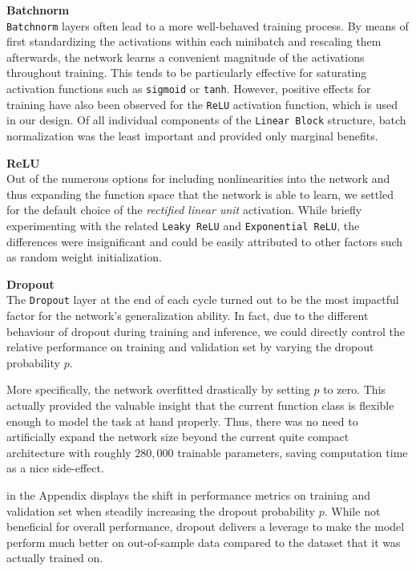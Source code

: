 \textbf{Batchnorm} \\
\texttt{Batchnorm} layers \citep{ioffe2015} often lead to a more well-behaved training process.
By means of first standardizing the activations within each minibatch and rescaling them afterwards, the network learns a convenient magnitude of the activations throughout training.
This tends to be particularly effective for saturating activation functions such as \texttt{sigmoid} or \texttt{tanh}. However, positive effects for training have also been observed for the \texttt{ReLU} activation function, which is used in our design.
Of all individual components of the \texttt{Linear Block} structure, batch normalization was the least important and provided only marginal benefits.

\textbf{ReLU} \\
Out of the numerous options for including nonlinearities into the network and thus expanding the function space that the network is able to learn, we settled for the default choice of the \emph{rectified linear unit} activation.
While briefly experimenting with the related \texttt{Leaky ReLU} and \texttt{Exponential ReLU}, the differences were insignificant and could be easily attributed to other factors such as random weight initialization.

\textbf{Dropout} \label{dropout} \\ 
The \texttt{Dropout} layer \citep{srivastava2014} at the end of each cycle turned out to be the most impactful factor for the network's generalization ability.
In fact, due to the different behaviour of dropout during training and inference, we could directly control the relative performance on training and validation set by varying the dropout probability $p$.

More specifically, the network overfitted drastically by setting $p$ to zero.
This actually provided the valuable insight that the current function class is flexible enough to model the task at hand properly.
Thus, there was no need to artificially expand the network size beyond the current quite compact architecture with roughly $280,000$ trainable parameters, saving computation time as a nice side-effect.

 in the Appendix displays the shift in performance metrics on training and validation set when steadily increasing the dropout probability $p$.
While not beneficial for overall performance, dropout delivers a leverage to make the model perform much better on out-of-sample data compared to the dataset that it was actually trained on.

